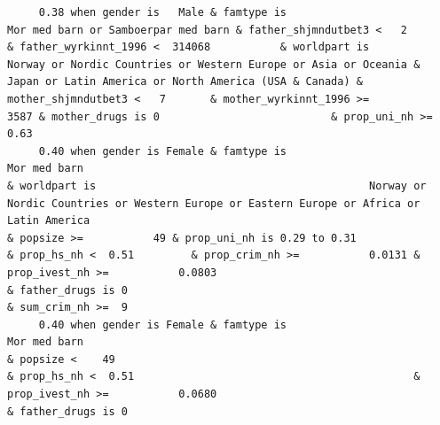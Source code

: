 \documentclass[
  letterpaper,
  DIV=11,
  numbers=noendperiod]{scrreprt}
\begin{document}
\begin{verbatim}
     0.38 when gender is   Male & famtype is                              Mor med barn or Samboerpar med barn & father_shjmndutbet3 <   2       & father_wyrkinnt_1996 <  314068           & worldpart is            Norway or Nordic Countries or Western Europe or Asia or Oceania & Japan or Latin America or North America (USA & Canada) & mother_shjmndutbet3 <   7       & mother_wyrkinnt_1996 >=             3587 & mother_drugs is 0                           & prop_uni_nh >=         0.63                                                                                                                                                                                                                                                                                                                                                                                 
     0.40 when gender is Female & famtype is                                                     Mor med barn                                                                              & worldpart is                                           Norway or Nordic Countries or Western Europe or Eastern Europe or Africa or Latin America                                                                                                  & popsize >=           49 & prop_uni_nh is 0.29 to 0.31                                      & prop_hs_nh <  0.51         & prop_crim_nh >=           0.0131 & prop_ivest_nh >=           0.0803                                                                                                                          & father_drugs is 0                                                                        & sum_crim_nh >=  9
     0.40 when gender is Female & famtype is                                                     Mor med barn                                                                                                                                                                                                                                                                                                                                  & popsize <    49                                                                            & prop_hs_nh <  0.51                                            & prop_ivest_nh >=           0.0680                                                                                                                          & father_drugs is 0                                                                                           

\end{verbatim}
\end{document}
